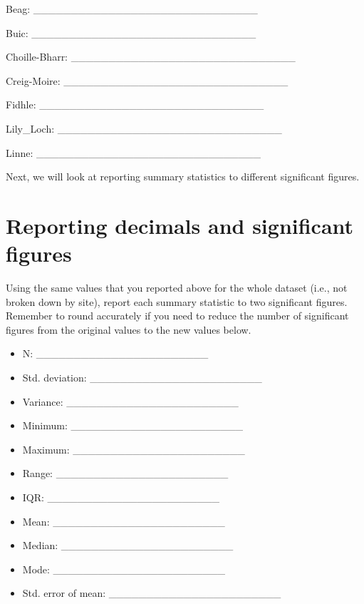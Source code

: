 \documentclass[
]{scrbook}
\providecommand{\tightlist}{%
  \setlength{\itemsep}{0pt}\setlength{\parskip}{0pt}}
\begin{document}
Beag: \_\_\_\_\_\_\_\_\_\_\_\_\_\_\_\_\_\_\_\_\_\_\_\_\_\_\_\_\_\_

Buic: \_\_\_\_\_\_\_\_\_\_\_\_\_\_\_\_\_\_\_\_\_\_\_\_\_\_\_\_\_\_

Choille-Bharr: \_\_\_\_\_\_\_\_\_\_\_\_\_\_\_\_\_\_\_\_\_\_\_\_\_\_\_\_\_\_

Creig-Moire: \_\_\_\_\_\_\_\_\_\_\_\_\_\_\_\_\_\_\_\_\_\_\_\_\_\_\_\_\_\_

Fidhle: \_\_\_\_\_\_\_\_\_\_\_\_\_\_\_\_\_\_\_\_\_\_\_\_\_\_\_\_\_\_

Lily\_Loch: \_\_\_\_\_\_\_\_\_\_\_\_\_\_\_\_\_\_\_\_\_\_\_\_\_\_\_\_\_\_

Linne: \_\_\_\_\_\_\_\_\_\_\_\_\_\_\_\_\_\_\_\_\_\_\_\_\_\_\_\_\_\_

Next, we will look at reporting summary statistics to different significant figures.

\hypertarget{reporting-decimals-and-significant-figures}{%
\section{Reporting decimals and significant figures}\label{reporting-decimals-and-significant-figures}}

Using the same values that you reported above for the whole dataset (i.e., not broken down by site), report each summary statistic to two significant figures.
Remember to round accurately if you need to reduce the number of significant figures from the original values to the new values below.

\begin{itemize}
\tightlist
\item
  N: \_\_\_\_\_\_\_\_\_\_\_\_\_\_\_\_\_\_\_\_\_\_\_
\item
  Std. deviation: \_\_\_\_\_\_\_\_\_\_\_\_\_\_\_\_\_\_\_\_\_\_\_
\item
  Variance: \_\_\_\_\_\_\_\_\_\_\_\_\_\_\_\_\_\_\_\_\_\_\_
\item
  Minimum: \_\_\_\_\_\_\_\_\_\_\_\_\_\_\_\_\_\_\_\_\_\_\_
\item
  Maximum: \_\_\_\_\_\_\_\_\_\_\_\_\_\_\_\_\_\_\_\_\_\_\_
\item
  Range: \_\_\_\_\_\_\_\_\_\_\_\_\_\_\_\_\_\_\_\_\_\_\_
\item
  IQR: \_\_\_\_\_\_\_\_\_\_\_\_\_\_\_\_\_\_\_\_\_\_\_
\item
  Mean: \_\_\_\_\_\_\_\_\_\_\_\_\_\_\_\_\_\_\_\_\_\_\_
\item
  Median: \_\_\_\_\_\_\_\_\_\_\_\_\_\_\_\_\_\_\_\_\_\_\_
\item
  Mode: \_\_\_\_\_\_\_\_\_\_\_\_\_\_\_\_\_\_\_\_\_\_\_
\item
  Std. error of mean: \_\_\_\_\_\_\_\_\_\_\_\_\_\_\_\_\_\_\_\_\_\_\_
\end{itemize}
\end{document}
